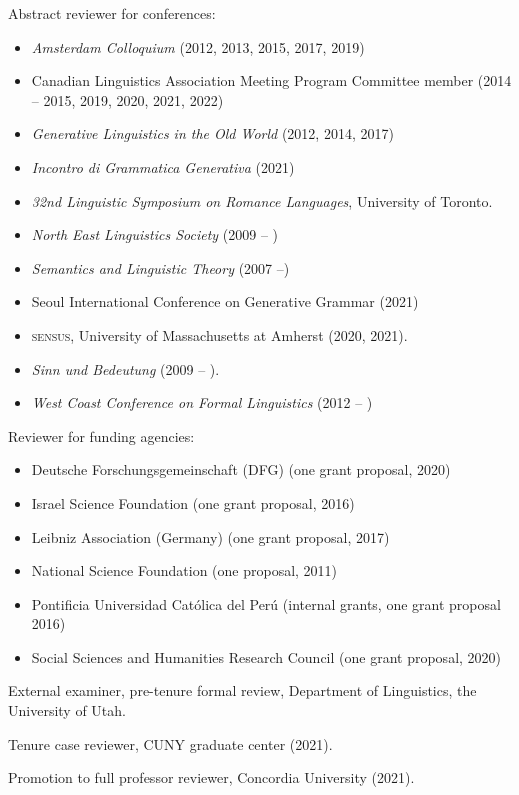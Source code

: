 \documentclass[11pt]{article}
\begin{document}
Abstract reviewer for conferences:

\begin{itemize}
\item [] \textit{Amsterdam Colloquium} (2012, 2013, 2015, 2017, 2019)
\item[] Canadian Linguistics Association Meeting Program Committee member (2014 -- 2015, 2019, 2020, 2021, 2022)
\item[] \textit{Generative Linguistics in the Old World} (2012, 2014, 2017)
\item[] \textit{Incontro di Grammatica Generativa} (2021)
\item[] \textit{32nd Linguistic Symposium on Romance Languages}, University of Toronto.
\item[] \textit{North East Linguistics Society} (2009 -- )
\item[] \textit{Semantics and Linguistic Theory} (2007 --)
\item[] Seoul International Conference on Generative Grammar (2021)
\item[] \textsc{sensus}, University of Massachusetts at Amherst (2020, 2021).
\item[] \textit{Sinn und Bedeutung} (2009 -- ).
\item[] \textit{West Coast Conference on Formal Linguistics} (2012 -- )
\end{itemize}


Reviewer for funding agencies:

\begin{itemize}
  \item[] Deutsche Forschungsgemeinschaft (DFG) (one grant proposal, 2020)
  \item[] Israel Science Foundation (one grant proposal, 2016)
  \item[] Leibniz Association (Germany) (one grant proposal, 2017)
  \item[] National Science Foundation (one proposal, 2011)
  \item[] Pontificia Universidad Cat\'olica del Per\'u (internal grants, one grant proposal 2016)
  \item[] Social Sciences and Humanities Research Council (one grant proposal, 2020)
  \end{itemize}


External examiner, pre-tenure formal review, Department of Linguistics, the University of Utah.

Tenure case reviewer, CUNY graduate center (2021).

Promotion to full professor reviewer, Concordia University (2021).
\end{document}
